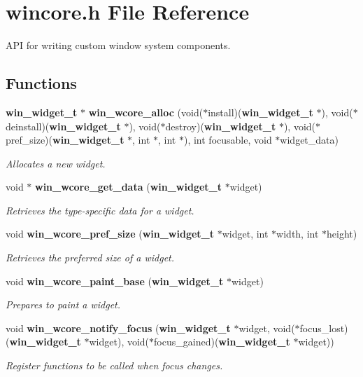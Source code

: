 \section{wincore.h File Reference}
\label{wincore_8h}
API for writing custom window system components. 

\subsection*{Functions}
\begin{CompactItemize}
\item 
{\bf win\_\-widget\_\-t} $\ast$ {\bf win\_\-wcore\_\-alloc} (void($\ast$install)({\bf win\_\-widget\_\-t} $\ast$), void($\ast$deinstall)({\bf win\_\-widget\_\-t} $\ast$), void($\ast$destroy)({\bf win\_\-widget\_\-t} $\ast$), void($\ast$pref\_\-size)({\bf win\_\-widget\_\-t} $\ast$, int $\ast$, int $\ast$), int focusable, void $\ast$widget\_\-data)
\begin{CompactList}\small\item\em Allocates a new widget. \item\end{CompactList}\item 
void $\ast$ {\bf win\_\-wcore\_\-get\_\-data} ({\bf win\_\-widget\_\-t} $\ast$widget)
\begin{CompactList}\small\item\em Retrieves the type-specific data for a widget. \item\end{CompactList}\item 
void {\bf win\_\-wcore\_\-pref\_\-size} ({\bf win\_\-widget\_\-t} $\ast$widget, int $\ast$width, int $\ast$height)
\begin{CompactList}\small\item\em Retrieves the preferred size of a widget. \item\end{CompactList}\item 
void {\bf win\_\-wcore\_\-paint\_\-base} ({\bf win\_\-widget\_\-t} $\ast$widget)
\begin{CompactList}\small\item\em Prepares to paint a widget. \item\end{CompactList}\item 
void {\bf win\_\-wcore\_\-notify\_\-focus} ({\bf win\_\-widget\_\-t} $\ast$widget, void($\ast$focus\_\-lost)({\bf win\_\-widget\_\-t} $\ast$widget), void($\ast$focus\_\-gained)({\bf win\_\-widget\_\-t} $\ast$widget))
\begin{CompactList}\small\item\em Register functions to be called when focus changes. \item\end{CompactList}\end{CompactItemize}



